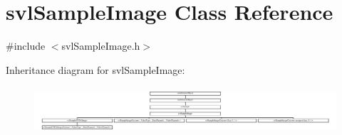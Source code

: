 \hypertarget{classsvl_sample_image}{}\section{svl\+Sample\+Image Class Reference}
\label{classsvl_sample_image}


{\ttfamily \#include $<$svl\+Sample\+Image.\+h$>$}

Inheritance diagram for svl\+Sample\+Image\+:\begin{figure}[H]
\begin{center}
\leavevmode
\includegraphics[height=1.768421cm]{dd/d81/classsvl_sample_image}
\end{center}
\end{figure}
